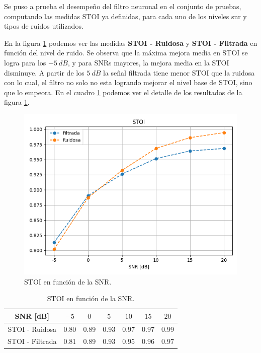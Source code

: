 Se puso a prueba el desempeño del filtro neuronal en el conjunto de pruebas, computando las medidas STOI ya definidas, para cada uno de los niveles snr y tipos de ruidos utilizados. 

En la figura \ref{fig:ch7_stoi_by_snr} podemos ver las medidas \textbf{STOI - Ruidosa} y \textbf{STOI - Filtrada} en función del nivel de ruido. Se observa que la máxima mejora media en STOI se logra para los $\SI{-5}{dB}$, y para SNRs mayores, la mejora media en la STOI disminuye. A partir de los $\SI{5}{dB}$ la señal filtrada tiene menor STOI que la ruidosa con lo cual, el filtro no solo no esta logrando mejorar el nivel base de STOI, sino que lo empeora. En el cuadro \ref{table:ch7_stoi_by_snr} podemos ver el detalle de los resultados de la figura \ref{fig:ch7_stoi_by_snr}.

\begin{figure}
	\centering
	\centerline{\includegraphics[scale=0.8]{images/ch7/stoi_by_snr.png}}
	\caption{STOI en función de la SNR.}
	\label{fig:ch7_stoi_by_snr}
\end{figure}

\begin{table}
	\centering
	\begin{tabular}{ |c|c|c|c|c|c|c| } 
		\hline
		SNR [dB] & $-5$ & $0$ & $5$ & $10$ & $15$ & $20$ \\ 
		\hline
		STOI - Ruidosa & 0.80 & 0.89 & 0.93 & 0.97 & 0.97 & 0.99 \\
		STOI - Filtrada & 0.81 & 0.89 & 0.93 & 0.95 & 0.96 & 0.97 \\
		\hline
	\end{tabular}
	\caption{STOI en función de la SNR.}
	\label{table:ch7_stoi_by_snr}
\end{table}


